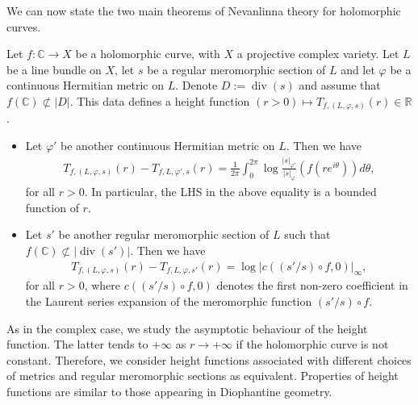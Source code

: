 \documentclass [11pt,reqno]{amsart}
\def\bC{{\mathbb{C}}}
\def\bR{{\mathbb{R}}}
\newcommand{\1}{\mathmybb{1}}
\def\div{\operatorname{div}}
\begin{document}
We can now state the two main theorems of Nevanlinna theory for holomorphic curves.

\begin{theorem}
\label{th:Nevanlinna_first_main_theorem}
Let $f : \bC \to X$ be a holomorphic curve, with $X$ a projective complex variety. Let $L$ be a line bundle on $X$, let $s$ be a regular meromorphic section of $L$ and let $\varphi$ be a continuous Hermitian metric on $L$. Denote $D:=\div(s)$ and assume that $f(\bC)\not\subset |D|$. This data defines a height function $(r>0) \mapsto T_{f,(L,\varphi,s)}(r) \in \bR$.
\begin{itemize}
	\item[(1)] Let $\varphi'$ be another continuous Hermitian metric on $L$. Then we have 
	\begin{align*}
	T_{f,(L,\varphi,s)}(r) - T_{f,{L,\varphi',s}}(r) = \frac{1}{2\pi}\int_{0}^{2\pi} \log \frac{|s|_{\varphi'}}{|s|_{\varphi}}(f(re^{i\theta})) d\theta,
	\end{align*}
for all $r>0$. In particular, the LHS in the above equality is a bounded function of $r$. 
	\item[(2)] Let $s'$ be another regular meromorphic section of $L$ such that $f(\bC) \not\subset |\div(s')|$. Then we have
	\begin{align*}
	T_{f,(L,\varphi,s)}(r) - T_{f,{L,\varphi,s'}}(r) = \log |c((s'/s)\circ f, 0)|_{\infty},
	\end{align*}
for all $r>0$, where $c((s'/s)\circ f, 0)$ denotes the first non-zero coefficient in the Laurent series expansion of the meromorphic function $(s'/s) \circ f$.
\end{itemize}
\end{theorem}

As in the complex case, we study the asymptotic behaviour of the height function. The latter tends to $+\infty$ as $r\to +\infty$ if the holomorphic curve is not constant. Therefore, we consider height functions associated with different choices of metrics and regular meromorphic sections as equivalent. Properties of height functions are similar to those appearing in Diophantine geometry. 
\end{document}
